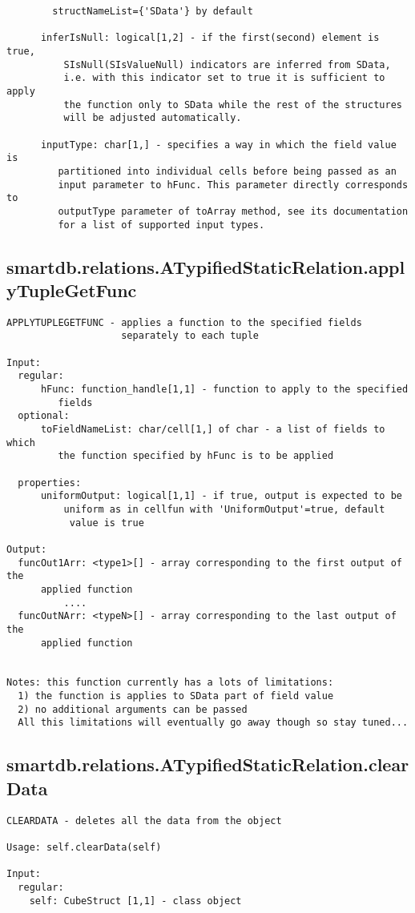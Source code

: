 \begin{verbatim}
        structNameList={'SData'} by default

      inferIsNull: logical[1,2] - if the first(second) element is true,
          SIsNull(SIsValueNull) indicators are inferred from SData,
          i.e. with this indicator set to true it is sufficient to apply
          the function only to SData while the rest of the structures
          will be adjusted automatically.

      inputType: char[1,] - specifies a way in which the field value is
         partitioned into individual cells before being passed as an
         input parameter to hFunc. This parameter directly corresponds to
         outputType parameter of toArray method, see its documentation
         for a list of supported input types.
\end{verbatim}
\subsection{\texorpdfstring{smartdb.relations.ATypifiedStaticRelation.applyTupleGetFunc}{applyTupleGetFunc}}\label{method:smartdb.relations.ATypifiedStaticRelation.applyTupleGetFunc}
\begin{verbatim}
APPLYTUPLEGETFUNC - applies a function to the specified fields
                    separately to each tuple

Input:
  regular:
      hFunc: function_handle[1,1] - function to apply to the specified
         fields
  optional:
      toFieldNameList: char/cell[1,] of char - a list of fields to which
         the function specified by hFunc is to be applied

  properties:
      uniformOutput: logical[1,1] - if true, output is expected to be
          uniform as in cellfun with 'UniformOutput'=true, default
           value is true

Output:
  funcOut1Arr: <type1>[] - array corresponding to the first output of the
      applied function
          ....
  funcOutNArr: <typeN>[] - array corresponding to the last output of the
      applied function


Notes: this function currently has a lots of limitations:
  1) the function is applies to SData part of field value
  2) no additional arguments can be passed
  All this limitations will eventually go away though so stay tuned...
\end{verbatim}
\subsection{\texorpdfstring{smartdb.relations.ATypifiedStaticRelation.clearData}{clearData}}\label{method:smartdb.relations.ATypifiedStaticRelation.clearData}
\begin{verbatim}
CLEARDATA - deletes all the data from the object

Usage: self.clearData(self)

Input:
  regular:
    self: CubeStruct [1,1] - class object
\end{verbatim}
